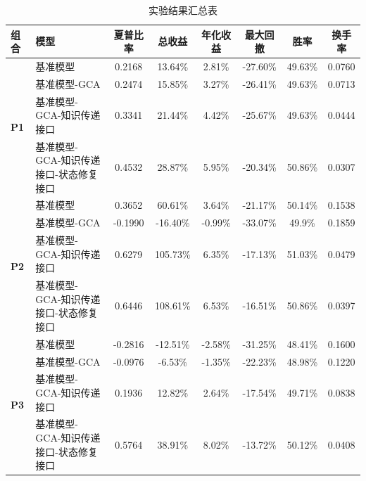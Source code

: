 \begin{table}[H]
\centering
\caption{实验结果汇总表}
\label{tab:experimental_results_summary}
\small
\setlength{\tabcolsep}{3pt}
\renewcommand{\arraystretch}{1.15}
\begin{tabular}{@{}p{}p{}cccccc@{}}
\toprule
\textbf{组合} & \textbf{模型} & \textbf{夏普比率} & \textbf{总收益} & \textbf{年化收益} & \textbf{最大回撤} & \textbf{胜率} & \textbf{换手率}\\
\midrule
\multirow{4}{*}{\textbf{P1}} 
& 基准模型 & 0.2168 & 13.64\% & 2.81\% & -27.60\% & 49.63\% & 0.0760\\
& 基准模型-GCA & 0.2474 & 15.85\% & 3.27\% & -26.41\% & 49.63\% & 0.0713\\ 
& 基准模型-GCA-知识传递接口 & 0.3341 & 21.44\% & 4.42\% & -25.67\% & 49.63\% & 0.0444\\
& 基准模型-GCA-知识传递接口-状态修复接口 & 0.4532 & 28.87\% & 5.95\% & -20.34\% & 50.86\% & 0.0307\\
\midrule
\multirow{4}{*}{\textbf{P2}} 
& 基准模型 & 0.3652 & 60.61\% & 3.64\% & -21.17\% & 50.14\% & 0.1538\\
& 基准模型-GCA & -0.1990 & -16.40\% & -0.99\% & -33.07\% & 49.9\% & 0.1859\\
& 基准模型-GCA-知识传递接口 & 0.6279 & 105.73\% & 6.35\% & -17.13\% & 51.03\% & 0.0479\\
& 基准模型-GCA-知识传递接口-状态修复接口 & 0.6446 & 108.61\% & 6.53\% & -16.51\% & 50.86\% & 0.0397\\
\midrule
\multirow{4}{*}{\textbf{P3}} 
& 基准模型 & -0.2816 & -12.51\% & -2.58\% & -31.25\% & 48.41\% & 0.1600 \\
& 基准模型-GCA & -0.0976 & -6.53\% & -1.35\% & -22.23\% & 48.98\% & 0.1220\\
& 基准模型-GCA-知识传递接口 & 0.1936 & 12.82\% & 2.64\% & -17.54\% & 49.71\% & 0.0838 \\
& 基准模型-GCA-知识传递接口-状态修复接口 & 0.5764 & 38.91\% & 8.02\% & -13.72\% & 50.12\% & 0.0408\\
\bottomrule
\end{tabular}
\end{table}

